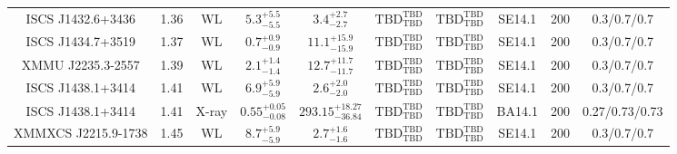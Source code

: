 \begin{table}
\begin{tabular}{cccccccccc}
ISCS J1432.6+3436 & 1.36 & WL & ${5.3}^{+5.5}_{-5.5}$ & ${3.4}^{+2.7}_{-2.7}$ & ${\mathrm{TBD}}^{\mathrm{TBD}}_{\mathrm{TBD}}$ & ${\mathrm{TBD}}^{\mathrm{TBD}}_{\mathrm{TBD}}$ & SE14.1 & 200 & 0.3/0.7/0.7 \\
ISCS J1434.7+3519 & 1.37 & WL & ${0.7}^{+0.9}_{-0.9}$ & ${11.1}^{+15.9}_{-15.9}$ & ${\mathrm{TBD}}^{\mathrm{TBD}}_{\mathrm{TBD}}$ & ${\mathrm{TBD}}^{\mathrm{TBD}}_{\mathrm{TBD}}$ & SE14.1 & 200 & 0.3/0.7/0.7 \\
XMMU J2235.3-2557 & 1.39 & WL & ${2.1}^{+1.4}_{-1.4}$ & ${12.7}^{+11.7}_{-11.7}$ & ${\mathrm{TBD}}^{\mathrm{TBD}}_{\mathrm{TBD}}$ & ${\mathrm{TBD}}^{\mathrm{TBD}}_{\mathrm{TBD}}$ & SE14.1 & 200 & 0.3/0.7/0.7 \\
ISCS J1438.1+3414 & 1.41 & WL & ${6.9}^{+5.9}_{-5.9}$ & ${2.6}^{+2.0}_{-2.0}$ & ${\mathrm{TBD}}^{\mathrm{TBD}}_{\mathrm{TBD}}$ & ${\mathrm{TBD}}^{\mathrm{TBD}}_{\mathrm{TBD}}$ & SE14.1 & 200 & 0.3/0.7/0.7 \\
ISCS J1438.1+3414 & 1.41 & X-ray & ${0.55}^{+0.05}_{-0.08}$ & ${293.15}^{+18.27}_{-36.84}$ & ${\mathrm{TBD}}^{\mathrm{TBD}}_{\mathrm{TBD}}$ & ${\mathrm{TBD}}^{\mathrm{TBD}}_{\mathrm{TBD}}$ & BA14.1 & 200 & 0.27/0.73/0.73 \\
XMMXCS J2215.9-1738 & 1.45 & WL & ${8.7}^{+5.9}_{-5.9}$ & ${2.7}^{+1.6}_{-1.6}$ & ${\mathrm{TBD}}^{\mathrm{TBD}}_{\mathrm{TBD}}$ & ${\mathrm{TBD}}^{\mathrm{TBD}}_{\mathrm{TBD}}$ & SE14.1 & 200 & 0.3/0.7/0.7 \\
\end{tabular}
\end{table}
